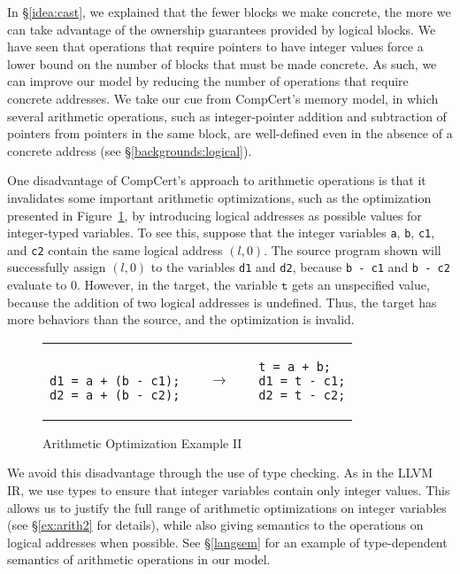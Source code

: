 In \S\ref{idea:cast}, we explained that the fewer blocks we make concrete, the more we can take advantage of the ownership guarantees provided by logical blocks. We have seen that operations that require pointers to have integer values force a lower bound on the number of blocks that must be made concrete. As such, we can improve our model by reducing the number of operations that require concrete addresses. We take our cue from CompCert's memory model, in which several arithmetic operations, such as integer-pointer addition and subtraction of pointers from pointers in the
same block, are well-defined even in the absence of a concrete address (see \S\ref{backgrounds:logical}). 

One disadvantage of CompCert's approach to arithmetic operations is that it invalidates some important arithmetic optimizations, such as the optimization presented in Figure~\ref{code:arith2}, by introducing logical addresses as possible values for integer-typed variables. 
To see this, suppose that the integer variables \texttt{a}, \texttt{b}, \texttt{c1}, and \texttt{c2} contain the same logical address $(l,0)$. The source program shown will successfully assign $(l,0)$ to the variables \texttt{d1} and \texttt{d2}, because \texttt{b - c1} and \texttt{b - c2} evaluate to $0$. However, in the target, the variable $\texttt{t}$ gets an unspecified value, because the addition of two logical addresses is undefined. Thus, the target has more behaviors than the source, and the optimization is invalid.

\begin{figure}[t]
\center
\begin{tabular}{lll}
\begin{lstlisting}

d1 = a + (b - c1);
d2 = a + (b - c2);
\end{lstlisting}
&
$\quad\rightarrow\quad$
&
\begin{lstlisting}
t = a + b;
d1 = t - c1;
d2 = t - c2;
\end{lstlisting}
\end{tabular}
\caption{Arithmetic Optimization Example II}\label{code:arith2}
\end{figure}

We avoid this disadvantage through the use of type checking. 
As in the LLVM IR, we use types to ensure that integer variables contain only integer values.
This allows us to justify the full range of arithmetic optimizations on integer variables (see \S\ref{ex:arith2} for details), 
while also giving semantics to the operations on logical addresses when possible.
See \S\ref{langsem} for an example of type-dependent semantics of arithmetic operations in our model.

